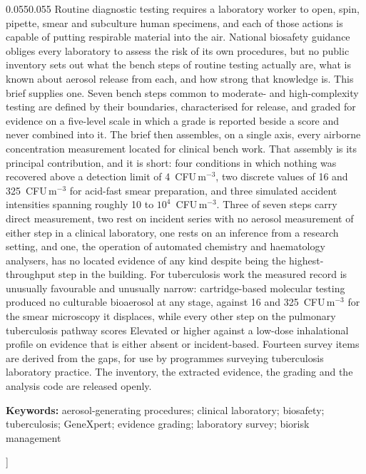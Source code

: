 \begin{@twocolumnfalse}
\begin{adjustwidth}{0.055\textwidth}{0.055\textwidth}
\noindent\small
Routine diagnostic testing requires a laboratory worker to open, spin, pipette,
smear and subculture human specimens, and each of those actions is capable of
putting respirable material into the air. National biosafety guidance obliges
every laboratory to assess the risk of its own procedures, but no public
inventory sets out what the bench steps of routine testing actually are, what
is known about aerosol release from each, and how strong that knowledge is.
This brief supplies one. Seven bench steps common to moderate- and
high-complexity testing are defined by their boundaries, characterised for
release, and graded for evidence on a five-level scale in which a grade is
reported beside a score and never combined into it. The brief then assembles,
on a single axis, every airborne concentration measurement located for clinical
bench work. That assembly is its principal contribution, and it is short:
four conditions in which nothing was recovered above a detection limit of
4~CFU\,m$^{-3}$, two discrete values of 16 and 325~CFU\,m$^{-3}$ for
acid-fast smear preparation, and three simulated accident intensities spanning
roughly 10 to $10^{4}$~CFU\,m$^{-3}$. Three of seven steps carry direct
measurement, two rest on incident series with no aerosol measurement of either
step in a clinical laboratory, one rests on an inference from a research
setting, and one, the operation of automated chemistry and haematology
analysers, has no located evidence of any kind despite being the
highest-throughput step in the building. For tuberculosis work the measured
record is unusually favourable and unusually narrow: cartridge-based molecular
testing produced no culturable bioaerosol at any stage, against 16 and
325~CFU\,m$^{-3}$ for the smear microscopy it displaces, while every other step
on the pulmonary tuberculosis pathway scores Elevated or higher against a
low-dose inhalational profile on evidence that is either absent or
incident-based. Fourteen survey items are derived from the gaps, for use by
programmes surveying tuberculosis laboratory practice. The inventory, the
extracted evidence, the grading and the analysis code are released openly.

\vspace{7pt}
\noindent\small\textbf{Keywords:} aerosol-generating procedures; clinical
laboratory; biosafety; tuberculosis; GeneXpert; evidence grading; laboratory
survey; biorisk management
\vspace{16pt}
\end{adjustwidth}
\end{@twocolumnfalse}
]
